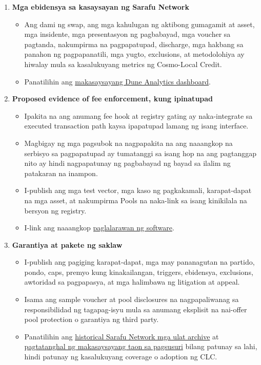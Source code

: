 \documentclass[11pt]{article}
\begin{document}
\begin{enumerate}[leftmargin=*]
\item \textbf{Mga ebidensya sa kasaysayan ng Sarafu Network}
\begin{itemize}[leftmargin=*]
\item Ang dami ng swap, ang mga kahulugan ng aktibong gumagamit at asset, mga insidente, mga presentasyon ng pagbabayad, mga voucher sa pagtanda, nakumpirma na pagpapatupad, discharge, mga hakbang sa panahon ng pagpapanatili, mga yugto, exclusions, at metodolohiya ay hiwalay mula sa kasalukuyang metrics ng Cosmo-Local Credit.
\item Panatilihin ang \href{https://dune.com/grassrootseconomics/sarafu-network}{makasaysayang Dune Analytics dashboard}.
\end{itemize}
\item \textbf{Proposed evidence of fee enforcement, kung ipinatupad}
\begin{itemize}[leftmargin=*]
\item Ipakita na ang anumang fee hook at registry gating ay naka-integrate sa executed transaction path kaysa ipapatupad lamang ng isang interface.
\item Magbigay ng mga pagsubok na nagpapakita na ang naaangkop na serbisyo sa pagpapatupad ay tumatanggi sa isang hop na ang pagtanggap nito ay hindi nagpapatunay ng pagbabayad ng bayad sa ilalim ng patakaran na inampon.
\item I-publish ang mga test vector, mga kaso ng pagkakamali, karapat-dapat na mga asset, at nakumpirma Pools na naka-link sa isang kinikilala na bersyon ng registry.
\item I-link ang naaangkop \href{https://software.grassecon.org}{paglalarawan ng software}.
\end{itemize}
\item \textbf{Garantiya at pakete ng saklaw}
\begin{itemize}[leftmargin=*]
\item I-publish ang pagiging karapat-dapat, mga may pananagutan na partido, pondo, caps, premyo kung kinakailangan, triggers, ebidensya, exclusions, awtoridad sa pagpapasya, at mga halimbawa ng litigation at appeal.
\item Isama ang sample voucher at pool disclosures na nagpapaliwanag sa responsibilidad ng tagapag-isyu mula sa anumang eksplisit na nai-offer pool protection o garantiya ng third party.
\item Panatilihin ang \href{https://sarafu.network/reports}{historical Sarafu Network mga ulat archive} at \href{https://youtu.be/5yGaP31bvs0?si=fZ-AMTEXsmVR8Ulv}{pagtatanghal ng makasaysayang taon sa pagsusuri} bilang patunay sa lahi, hindi patunay ng kasalukuyang coverage o adoption ng CLC.

\end{itemize}
\end{enumerate}
\end{document}
